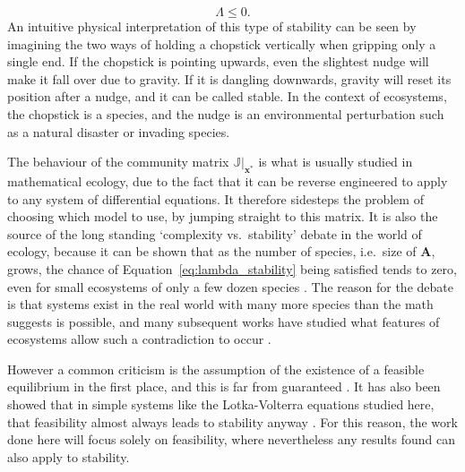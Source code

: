 \begin{equation}
    \Lambda \leq 0.
    \label{eq:lambda_stability}
\end{equation}
An intuitive physical interpretation of this type of stability can be seen by imagining the two ways of holding a chopstick vertically when gripping only a single end. If the chopstick is pointing upwards, even the slightest nudge will make it fall over due to gravity. If it is dangling downwards, gravity will reset its position after a nudge, and it can be called stable.
In the context of ecosystems, the chopstick is a species, and the nudge is an environmental perturbation such as a natural disaster or invading species.

The behaviour of the community matrix $\mathbb{J}|_\mathbf{x^*}$ is what is usually studied in mathematical ecology, due to the fact that it can be reverse engineered to apply to any system of differential equations. It therefore sidesteps the problem of choosing which model to use, by jumping straight to this matrix.
It is also the source of the long standing `complexity vs.\ stability' debate in the world of ecology, because it can be shown that as the number of species, i.e.\ size of $\mathbf{A}$, grows, the chance of Equation~\eqref{eq:lambda_stability} being satisfied tends to zero, even for small ecosystems of only a few dozen species \cite{May1973}.
The reason for the debate is that systems exist in the real world with many more species than the math suggests is possible, and many subsequent works have studied what features of ecosystems allow such a contradiction to occur \cite{Tang2014, brose, samjohnson}.

However a common criticism is the assumption of the existence of a feasible equilibrium in the first place, and this is far from guaranteed \cite{TODO}. It has also been showed that in simple systems like the Lotka-Volterra equations studied here, that feasibility almost always leads to stability anyway \cite{Dougoud2018}. For this reason, the work done here will focus solely on feasibility, where nevertheless any results found can also apply to stability.


